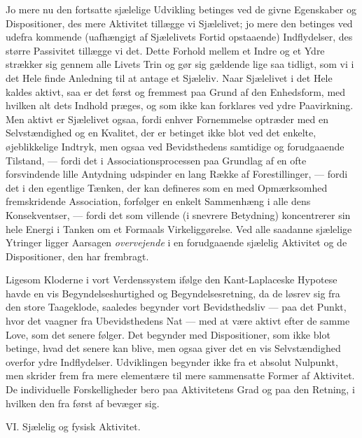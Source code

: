 \documentclass[12pt,a4paper,openany]{book}
\newcommand{\opage}[1]{\marginnote{\footnotesize\textit{[#1]}}}
\begin{document}
Jo mere nu den fortsatte sjælelige Udvikling betinges ved de givne Egenskaber
og Dispositioner, des mere Aktivitet tillægge vi Sjælelivet; jo mere den
betinges ved udefra kommende (uafhængigt af Sjælelivets Fortid opstaaende)
Indflydelser, des større Passivitet tillægge vi det. Dette Forhold mellem et
Indre og et Ydre strækker sig gennem alle Livets Trin og gør sig gældende lige
saa tidligt, som vi i det Hele finde Anledning til at antage et Sjæleliv. Naar
Sjælelivet i det Hele kaldes aktivt, saa er det først og fremmest paa Grund af
den Enhedsform, med hvilken alt dets Indhold præges, og som ikke kan forklares
ved ydre Paavirkning. Men aktivt er Sjælelivet ogsaa, fordi enhver Fornemmelse
\setcounter{footnote}{0}%
\opage{81}optræder med en Selvstændighed og en Kvalitet, der er betinget ikke
blot ved det enkelte, øjeblikkelige Indtryk, men ogsaa ved Bevidsthedens
samtidige og forudgaaende Tilstand, --- fordi det i Associationsprocessen paa
Grundlag af en ofte forsvindende lille Antydning udspinder en lang Række af
Forestillinger, --- fordi det i den egentlige Tænken, der kan defineres som en
med Opmærksomhed fremskridende Association, forfølger en enkelt Sammenhæng i
alle dens Konsekventser, --- fordi det som villende (i snevrere Betydning)
koncentrerer sin hele Energi i Tanken om et Formaals Virkeliggørelse. Ved alle
saadanne sjælelige Ytringer ligger Aarsagen \emph{overvejende} i en
forudgaaende sjælelig Aktivitet og de Dispositioner, den har frembragt.

Ligesom Kloderne i vort Verdenssystem ifølge den Kant-Laplaceske Hypotese havde
en vis Begyndelseshurtighed og Begyndelsesretning, da de løsrev sig fra den
store Taageklode, saaledes begynder vort Bevidsthedsliv --- paa det Punkt, hvor
det vaagner fra Ubevidsthedens Nat --- med at være aktivt efter de samme Love,
som det senere følger. Det begynder med Dispositioner, som ikke blot betinge,
hvad det senere kan blive, men ogsaa giver det en vis Selvstændighed overfor
ydre Indflydelser. Udviklingen begynder ikke fra et absolut Nulpunkt, men
skrider frem fra mere elementære til mere sammensatte Former af Aktivitet. De
individuelle Forskelligheder bero paa Aktivitetens Grad og paa den Retning, i
hvilken den fra først af bevæger sig.

\begin{center}\large VI. Sjælelig og fysisk Aktivitet.\end{center}
\end{document}
